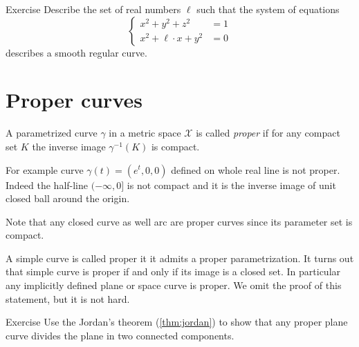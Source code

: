 \begin{thm}{Exercise}\label{ex:viviani}
Describe the set of real numbers $\ell$
such that the system of equations
\[\begin{cases}
x^2+y^2+z^2&=1
\\
x^2+\ell\cdot x+y^2&=0
\end{cases}\]
describes a smooth regular curve.
\end{thm}

\section*{Proper curves}

A parametrized curve $\gamma$ in a metric space $\mathcal{X}$ is called \emph{proper} if for any compact set $K$ the inverse image $\gamma^{-1}(K)$ is compact.

For example curve $\gamma(t)=(e^t,0,0)$ defined on whole real line is not proper.
Indeed the half-line $(-\infty,0]$ is not compact and it is the inverse image of unit closed ball around the origin.  

Note that any closed curve as well arc are proper curves since its parameter set is compact.

A simple curve is called proper it it admits a proper parametrization.
It turns out that simple curve is proper if and only if its image is a closed set.
In particular any implicitly defined plane or space curve is proper.
We omit the proof of this statement, but it is not hard. %

\begin{thm}{Exercise}
Use the Jordan's theorem (\ref{thm:jordan}) to show that any proper plane curve divides the plane in two connected components.  
\end{thm}



